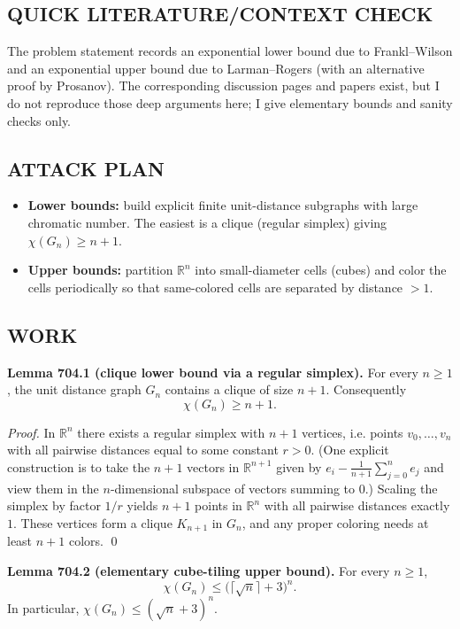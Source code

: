 \subsection*{QUICK LITERATURE/CONTEXT CHECK}
The problem statement records an exponential lower bound due to Frankl--Wilson and an exponential upper bound due to Larman--Rogers (with an alternative proof by Prosanov). The corresponding discussion pages and papers exist, but I do not reproduce those deep arguments here; I give elementary bounds and sanity checks only.

\subsection*{ATTACK PLAN}
\begin{itemize}
\item \textbf{Lower bounds:} build explicit finite unit-distance subgraphs with large chromatic number. The easiest is a clique (regular simplex) giving $\chi(G_n)\ge n+1$.
\item \textbf{Upper bounds:} partition $\mathbb{R}^n$ into small-diameter cells (cubes) and color the cells periodically so that same-colored cells are separated by distance $>1$.
\end{itemize}

\subsection*{WORK}
\textbf{Lemma 704.1 (clique lower bound via a regular simplex).}
For every $n\ge 1$, the unit distance graph $G_n$ contains a clique of size $n+1$. Consequently
\[\chi(G_n)\ge n+1.
\]

\emph{Proof.}
In $\mathbb{R}^n$ there exists a regular simplex with $n+1$ vertices, i.e. points $v_0,\dots,v_n$ with all pairwise distances equal to some constant $r>0$.
(One explicit construction is to take the $n+1$ vectors in $\mathbb{R}^{n+1}$ given by $e_i-\tfrac{1}{n+1}\sum_{j=0}^n e_j$ and view them in the $n$-dimensional subspace of vectors summing to $0$.)
Scaling the simplex by factor $1/r$ yields $n+1$ points in $\mathbb{R}^n$ with all pairwise distances exactly $1$.
These vertices form a clique $K_{n+1}$ in $G_n$, and any proper coloring needs at least $n+1$ colors. \qed

\medskip
\textbf{Lemma 704.2 (elementary cube-tiling upper bound).}
For every $n\ge 1$,
\[\chi(G_n)\le \bigl(\lceil\sqrt{n}\rceil+3\bigr)^n.
\]
In particular, $\chi(G_n)\le (\sqrt{n}+3)^n$.

